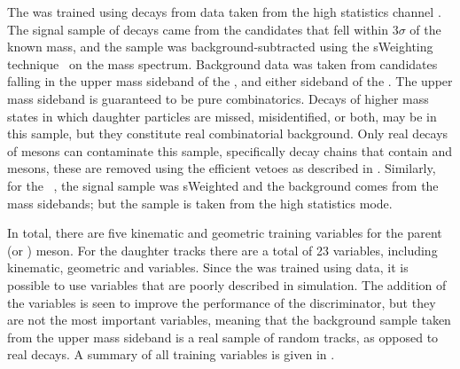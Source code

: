 
The \dstokkpi\xspace\bdt was trained using \dstokkpi decays from data taken from the
high statistics channel \decay{\Bsb}{\Dsp\pim}.
The signal sample of \Ds decays came from the \dstokkpi candidates that fell within $3\sigma$ of
the known \Ds mass, and the sample was
background-subtracted using the sWeighting technique~\cite{splot} on the \Bp mass spectrum.
Background data was taken from candidates falling in the upper mass sideband of the \Bp, and either
sideband of the \Ds.
The upper mass sideband is guaranteed to be pure combinatorics.
Decays of higher mass states in which daughter particles are missed,
misidentified, or both, may be in this sample, but they constitute real combinatorial background.
Only real decays of \Bs mesons can contaminate this sample, specifically decay chains that
contain \Dp and \Lc mesons, these are removed using
the efficient vetoes as described in .
Similarly, for the \phii\ \bdt, the signal sample was sWeighted and the background comes from the
\phii mass sidebands; but the sample is taken from the high statistics \bstojpsiphi mode.

In total, there are five kinematic and geometric training variables for the parent (\Ds or \phii) meson.
For the daughter tracks there are a total of 23 variables, including kinematic, geometric and \pid
variables.
Since the \bdt was trained using data, it is possible to use \pid variables that are poorly
described in simulation.
The addition of the \pid variables is seen to improve the performance of the discriminator, but
they are not the most important variables, meaning that the background sample taken from the
upper mass sideband is a real sample of random tracks, as opposed to real decays.
A summary of all training variables is given in .

